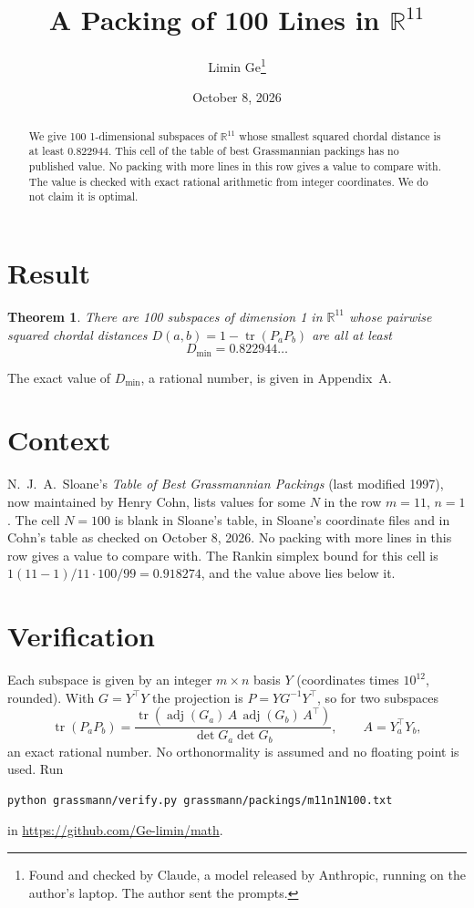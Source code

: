 \documentclass[11pt,a4paper]{article}
\title{A Packing of 100 Lines in $\mathbb{R}^{11}$}
\author{Limin Ge\thanks{Found and checked by Claude, a model released by Anthropic, running on the author's laptop. The author sent the prompts.}}
\date{October 8, 2026}
\newtheorem*{theorem}{Theorem}
\begin{document}
\maketitle
\begin{abstract}
We give 100 1-dimensional subspaces of $\mathbb{R}^{11}$ whose smallest squared chordal distance is at least 0.822944. This cell of the table of best Grassmannian packings has no published value. No packing with more lines in this row gives a value to compare with. The value is checked with exact rational arithmetic from integer coordinates. We do not claim it is optimal.
\end{abstract}

\section{Result}
\begin{theorem}
There are 100 subspaces of dimension 1 in $\mathbb{R}^{11}$ whose pairwise squared chordal distances $D(a,b) = 1 - \operatorname{tr}(P_aP_b)$ are all at least
\[ D_{\min} = 0.822944\ldots \]
\end{theorem}
The exact value of $D_{\min}$, a rational number, is given in Appendix~A.


\section{Context}
N.~J.~A.~Sloane's \emph{Table of Best Grassmannian Packings} (last modified 1997), now maintained by Henry Cohn, lists values for some $N$ in the row $m=11$, $n=1$. The cell $N=100$ is blank in Sloane's table, in Sloane's coordinate files and in Cohn's table as checked on October 8, 2026. No packing with more lines in this row gives a value to compare with. The Rankin simplex bound for this cell is $1(11-1)/11\cdot 100/99 = 0.918274$, and the value above lies below it.


\section{Verification}
Each subspace is given by an integer $m\times n$ basis $Y$ (coordinates times $10^{12}$, rounded). With $G=Y^\top Y$ the projection is $P=YG^{-1}Y^\top$, so for two subspaces
\[ \operatorname{tr}(P_aP_b)=\frac{\operatorname{tr}(\operatorname{adj}(G_a)\,A\,\operatorname{adj}(G_b)\,A^\top)}{\det G_a\det G_b},\qquad A=Y_a^\top Y_b, \]
an exact rational number. No orthonormality is assumed and no floating point is used. Run
\begin{verbatim}
python grassmann/verify.py grassmann/packings/m11n1N100.txt
\end{verbatim}
in \url{https://github.com/Ge-limin/math}.
\end{document}
